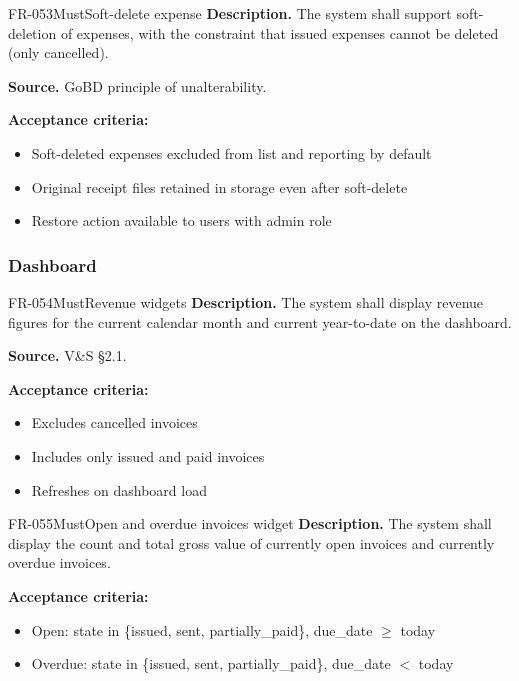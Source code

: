 \documentclass[11pt,a4paper]{article}
\begin{document}
\begin{requirement}{FR-053}{Must}{Soft-delete expense}
\textbf{Description.} The system shall support soft-deletion of expenses, with the constraint that issued expenses cannot be deleted (only cancelled).

\textbf{Source.} GoBD principle of unalterability.

\textbf{Acceptance criteria:}
\begin{itemize}
    \item Soft-deleted expenses excluded from list and reporting by default
    \item Original receipt files retained in storage even after soft-delete
    \item Restore action available to users with admin role
\end{itemize}
\end{requirement}

\subsubsection{Dashboard}

\begin{requirement}{FR-054}{Must}{Revenue widgets}
\textbf{Description.} The system shall display revenue figures for the current calendar month and current year-to-date on the dashboard.

\textbf{Source.} V\&S \S2.1.

\textbf{Acceptance criteria:}
\begin{itemize}
    \item Excludes cancelled invoices
    \item Includes only issued and paid invoices
    \item Refreshes on dashboard load
\end{itemize}
\end{requirement}

\begin{requirement}{FR-055}{Must}{Open and overdue invoices widget}
\textbf{Description.} The system shall display the count and total gross value of currently open invoices and currently overdue invoices.

\textbf{Acceptance criteria:}
\begin{itemize}
    \item Open: state in \{issued, sent, partially\_paid\}, due\_date $\geq$ today
    \item Overdue: state in \{issued, sent, partially\_paid\}, due\_date $<$ today
\end{itemize}
\end{requirement}
\end{document}
